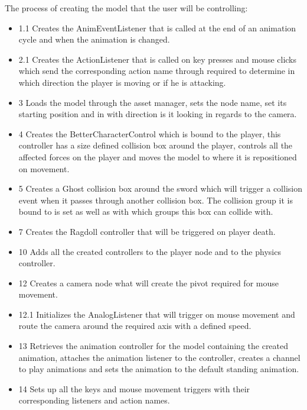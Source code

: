 \documentclass[letterpaper]{article}
\begin{document}
					The process of creating the model that the user will be controlling:
					\begin{itemize}
						\item 1.1 Creates the AnimEventListener that is called at the end of an animation cycle and when the animation is changed.
						\item 2.1 Creates the ActionListener that is called on key presses and mouse clicks which send the corresponding action name through required to determine in which direction the player is moving or if he is attacking.
						\item 3 Loads the model through the asset manager, sets the node name, set its starting position and in with direction is it looking in regards to the camera.
						\item 4 Creates the BetterCharacterControl which is bound to the player, this controller has a size defined collision box around the player, controls all the affected forces on the player and moves the model to where it is repositioned on movement.
						\item 5 Creates a Ghost collision box around the sword which will trigger a collision event when it passes through another collision box. The collision group it is bound to is set as well as with which groups this box can collide with.
						\item 7 Creates the Ragdoll controller that will be triggered on player death.
						\item 10 Adds all the created controllers to the player node and to the physics controller.
						\item 12 Creates a camera node what will create the pivot required for mouse movement.
						\item 12.1 Initializes the AnalogListener that will trigger on mouse movement and route the camera around the required axis with a defined speed.
						\item 13 Retrieves the animation controller for the model containing the created animation, attaches the animation listener to the controller, creates a channel to play animations and sets the animation to the default standing animation.
						\item 14 Sets up all the keys and mouse movement triggers with their corresponding listeners and action names.
					\end{itemize}
					
\end{document}
